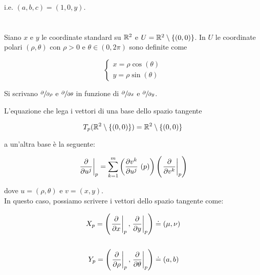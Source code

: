 i.e. $ (a,b,c) = (1,0,y) $.

%

\newpage

%

\section{}\label{es2-9}

\begin{tcolorbox}
	Siano $ x $ e $ y $ le coordinate standard su $ \mathbb{R}^{2} $ e $ U = \mathbb{R}^{2} \setminus \{(0,0)\} $. In $ U $ le coordinate polari $ (\rho, \theta) $ con $ \rho > 0 $ e $ \theta \in (0,2\pi) $ sono definite come
	
	\begin{equation}
		\begin{cases}
			x = \rho \cos(\theta)\\
			y = \rho \sin(\theta)
		\end{cases}
	\end{equation}
	
	Si scrivano $ \sfrac{\partial}{\partial \rho} $ e $ \sfrac{\partial}{\partial \theta} $ in funzione di $ \sfrac{\partial}{\partial x} $ e $ \sfrac{\partial}{\partial y} $.
\end{tcolorbox}

L'equazione che lega i vettori di una base dello spazio tangente

\begin{equation}
	T_{p}(\mathbb{R}^{2} \setminus \{(0,0)\}) = \mathbb{R}^{2} \setminus \{(0,0)\}
\end{equation}

a un'altra base è la seguente:

\begin{equation}
	\eval{\pdv{u^{j}}}_{p} = \sum_{k=1}^{m} \left( \pdv{v^{k}}{u^{j}}\ (p) \right) \left( \eval{\pdv{v^{k}}}_{p} \right)
\end{equation}

dove $ u = (\rho,\theta) $ e $ v = (x,y) $.\\
In questo caso, possiamo scrivere i vettori dello spazio tangente come:

\begin{align}
	\begin{split}
		X_{p} = \left( \eval{\pdv{x}}_{p}, \eval{\pdv{y}}_{p} \right) &\doteq (\mu,\nu)\\\\
		Y_{p} = \left( \eval{\pdv{\rho}}_{p}, \eval{\pdv{\theta}}_{p} \right) &\doteq (a,b)
	\end{split}
\end{align}

